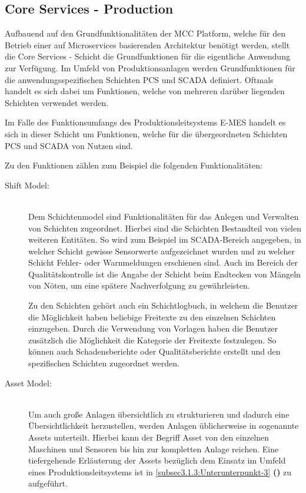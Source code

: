 
\subsection{Core Services - Production\label{subsec3.1.2:Unterunterpunkt-2}}

Aufbauend auf den Grundfunktionalitäten der \glqq MCC Platform\grqq{}, welche für den Betrieb einer auf Microservices basierenden Architektur benötigt werden, stellt die \glqq Core Services\grqq{} - Schicht die Grundfunktionen für die eigentliche Anwendung zur Verfügung. Im Umfeld von Produktionsanlagen werden Grundfunktionen für die anwendungsspezifischen Schichten \glqq PCS\grqq{} und \glqq SCADA\grqq{} definiert. Oftmals handelt es sich dabei um Funktionen, welche von mehreren darüber liegenden Schichten verwendet werden.

Im Falle des Funktionsumfangs des Produktionsleitsystems \glqq E-MES\grqq{} handelt es sich in dieser Schicht um Funktionen, welche für die übergeordneten Schichten \glqq PCS\grqq{} und \glqq SCADA\grqq{} von Nutzen sind.

Zu den Funktionen zählen zum Beispiel die folgenden Funktionalitäten:

\begin{description}

    \item[Shift Model:]\hfill \\
    Dem Schichtenmodel sind Funktionalitäten für das Anlegen und Verwalten von Schichten zugeordnet. Hierbei sind die Schichten Bestandteil von vielen weiteren Entitäten. So wird zum Beispiel im SCADA-Bereich angegeben, in welcher Schicht gewisse Sensorwerte aufgezeichnet wurden und zu welcher Schicht Fehler- oder Warnmeldungen erschienen sind. Auch im Bereich der Qualitätskontrolle ist die Angabe der Schicht beim Endtecken von Mängeln von Nöten, um eine spätere Nachverfolgung zu gewährleisten.

    Zu den Schichten gehört auch ein Schichtlogbuch, in welchem die Benutzer die Möglichkeit haben beliebige Freitexte zu den einzelnen Schichten einzugeben. Durch die Verwendung von Vorlagen haben die Benutzer zusätzlich die Möglichkeit die Kategorie der Freitexte festzulegen. So können auch Schadensberichte oder Qualitätsberichte erstellt und den spezifischen Schichten zugeordnet werden.

    \item[Asset Model:]\hfill \\
    Um auch große Anlagen übersichtlich zu strukturieren und dadurch eine Übersichtlichkeit herzustellen, werden Anlagen üblicherweise in sogenannte \glqq Assets\grqq{} unterteilt. Hierbei kann der Begriff \glqq Asset\grqq{} von den einzelnen Maschinen und Sensoren bis hin zur kompletten Anlage reichen. Eine tiefergehende Erläuterung der \glqq Assets\grqq{} bezüglich dem Einsatz im Umfeld eines Produktionsleitsystems ist in \autoref{subsec3.1.3:Unterunterpunkt-3} \textbf{()} zu aufgeführt.

\end{description}

